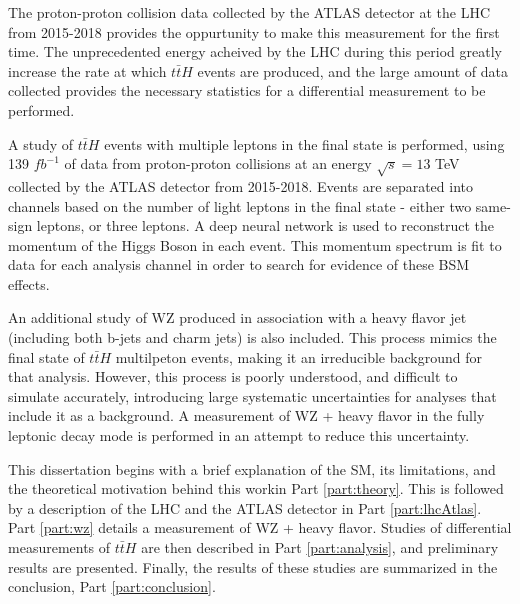 The proton-proton collision data collected by the ATLAS detector at the LHC from 2015-2018 provides the oppurtunity to make this measurement for the first time. The unprecedented energy acheived by the LHC during this period greatly increase the rate at which $t\bar{t}H$ events are produced, and the large amount of data collected provides the necessary statistics for a differential measurement to be performed.

A study of $t\bar{t}H$ events with multiple leptons in the final state is performed, using 139 $fb^{-1}$ of data from proton-proton collisions at an energy $\sqrt{s} = 13$ TeV collected by the ATLAS detector from 2015-2018. Events are separated into channels based on the number of light leptons in the final state - either two same-sign leptons, or three leptons. A deep neural network is used to reconstruct the momentum of the Higgs Boson in each event. This momentum spectrum is fit to data for each analysis channel in order to search for evidence of these BSM effects.

An additional study of WZ produced in association with a heavy flavor jet (including both b-jets and charm jets) is also included. This process mimics the final state of $t\bar{t}H$ multilpeton events, making it an irreducible background for that analysis. However, this process is poorly understood, and difficult to simulate accurately, introducing large systematic uncertainties for analyses that include it as a background. A measurement of WZ + heavy flavor in the fully leptonic decay mode is performed in an attempt to reduce this uncertainty.

This dissertation begins with a brief explanation of the SM, its limitations, and the theoretical motivation behind this workin Part \ref{part:theory}. This is followed by a description of the LHC and the ATLAS detector in Part \ref{part:lhcAtlas}. Part \ref{part:wz} details a measurement of WZ + heavy flavor. Studies of differential measurements of $t\bar{t}H$ are then described in Part \ref{part:analysis}, and preliminary results are presented. Finally, the results of these studies are summarized in the conclusion, Part \ref{part:conclusion}.

